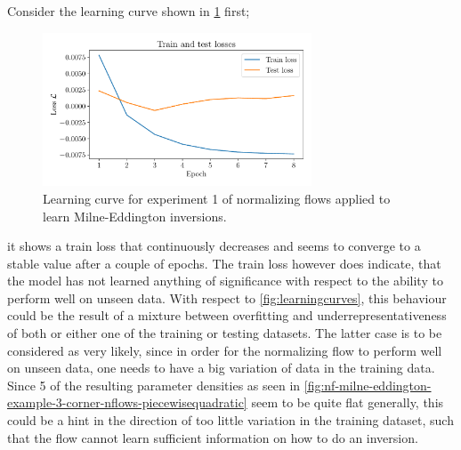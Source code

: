 \documentclass[a4paper,12pt]{report}
\begin{document}
Consider the learning curve shown in \cref{fig:nf-milne-eddington-example-3-loss-nflows-piecewisequadratic} first; 
\begin{figure}[h]
\centering
\includegraphics[width=8cm]{figures/nf-milne-eddington-example-3-loss-nflows-piecewisequadratic.pdf}
\caption{Learning curve for experiment 1 of normalizing flows applied to learn Milne-Eddington inversions.}
\label{fig:nf-milne-eddington-example-3-loss-nflows-piecewisequadratic}
\end{figure}
it shows a train loss that continuously decreases and seems to converge to a stable value after a couple of epochs. The train loss however does indicate, that the model has not learned anything of significance with respect to the ability to perform well on unseen data. With respect to \cref{fig:learningcurves}, this behaviour could be the result of a mixture between overfitting and underrepresentativeness of both or either one of the training or testing datasets. The latter case is to be considered as very likely, since in order for the normalizing flow to perform well on unseen data, one needs to have a big variation of data in the training data. Since 5 of the resulting parameter densities as seen in \cref{fig:nf-milne-eddington-example-3-corner-nflows-piecewisequadratic} seem to be quite flat generally, this could be a hint in the direction of too little variation in the training dataset, such that the flow cannot learn sufficient information on how to do an inversion.
\end{document}
